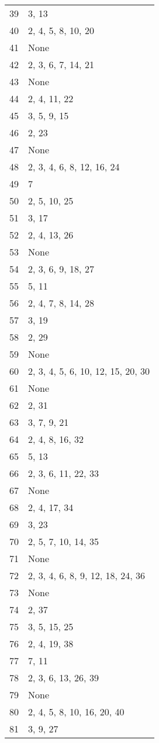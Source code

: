 \documentclass[12pt]{article}
\begin{document}
\begin{tabular}{|r|l|}
39 & 3, 13 \\ 
40 & 2, 4, 5, 8, 10, 20 \\ 
41 & None \\ 
42 & 2, 3, 6, 7, 14, 21 \\ 
43 & None \\ 
44 & 2, 4, 11, 22 \\ 
45 & 3, 5, 9, 15 \\ 
46 & 2, 23 \\ 
47 & None \\ 
48 & 2, 3, 4, 6, 8, 12, 16, 24 \\ 
49 & 7 \\ 
50 & 2, 5, 10, 25 \\ 
51 & 3, 17 \\ 
52 & 2, 4, 13, 26 \\ 
53 & None \\ 
54 & 2, 3, 6, 9, 18, 27 \\ 
55 & 5, 11 \\ 
56 & 2, 4, 7, 8, 14, 28 \\ 
57 & 3, 19 \\ 
58 & 2, 29 \\ 
59 & None \\ 
60 & 2, 3, 4, 5, 6, 10, 12, 15, 20, 30 \\ 
61 & None \\ 
62 & 2, 31 \\ 
63 & 3, 7, 9, 21 \\ 
64 & 2, 4, 8, 16, 32 \\ 
65 & 5, 13 \\ 
66 & 2, 3, 6, 11, 22, 33 \\ 
67 & None \\ 
68 & 2, 4, 17, 34 \\ 
69 & 3, 23 \\ 
70 & 2, 5, 7, 10, 14, 35 \\ 
71 & None \\ 
72 & 2, 3, 4, 6, 8, 9, 12, 18, 24, 36 \\ 
73 & None \\ 
74 & 2, 37 \\ 
75 & 3, 5, 15, 25 \\ 
76 & 2, 4, 19, 38 \\ 
77 & 7, 11 \\ 
78 & 2, 3, 6, 13, 26, 39 \\ 
79 & None \\ 
80 & 2, 4, 5, 8, 10, 16, 20, 40 \\ 
81 & 3, 9, 27 \\ 

\end{tabular}
\end{document}
